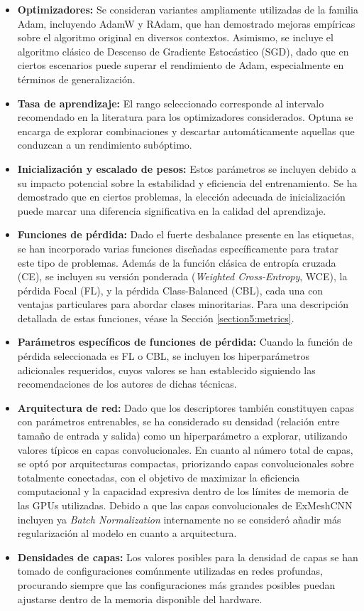\begin{itemize}
    \item \textbf{Optimizadores:} Se consideran variantes ampliamente utilizadas de la familia Adam, incluyendo AdamW y RAdam, que han demostrado mejoras empíricas sobre el algoritmo original en diversos contextos. Asimismo, se incluye el algoritmo clásico de Descenso de Gradiente Estocástico (SGD), dado que en ciertos escenarios puede superar el rendimiento de Adam, especialmente en términos de generalización.
    \item \textbf{Tasa de aprendizaje:} El rango seleccionado corresponde al intervalo recomendado en la literatura para los optimizadores considerados. Optuna se encarga de explorar combinaciones y descartar automáticamente aquellas que conduzcan a un rendimiento subóptimo. 
    \item \textbf{Inicialización y escalado de pesos:} Estos parámetros se incluyen debido a su impacto potencial sobre la estabilidad y eficiencia del entrenamiento. Se ha demostrado que en ciertos problemas, la elección adecuada de inicialización puede marcar una diferencia significativa en la calidad del aprendizaje.
    \item \textbf{Funciones de pérdida:} Dado el fuerte desbalance presente en las etiquetas, se han incorporado varias funciones diseñadas específicamente para tratar este tipo de problemas. Además de la función clásica de entropía cruzada (CE), se incluyen su versión ponderada (\textit{Weighted Cross-Entropy}, WCE), la pérdida Focal (FL), y la pérdida Class-Balanced (CBL), cada una con ventajas particulares para abordar clases minoritarias. Para una descripción detallada de estas funciones, véase la Sección \ref{section5:metrics}.
    \item \textbf{Parámetros específicos de funciones de pérdida:} Cuando la función de pérdida seleccionada es FL o CBL, se incluyen los hiperparámetros adicionales requeridos, cuyos valores se han establecido siguiendo las recomendaciones de los autores de dichas técnicas.
    \item \textbf{Arquitectura de red:} Dado que los descriptores también constituyen capas con parámetros entrenables, se ha considerado su densidad (relación entre tamaño de entrada y salida) como un hiperparámetro a explorar, utilizando valores típicos en capas convolucionales. En cuanto al número total de capas, se optó por arquitecturas compactas, priorizando capas convolucionales sobre totalmente conectadas, con el objetivo de maximizar la eficiencia computacional y la capacidad expresiva dentro de los límites de memoria de las GPUs utilizadas. Debido a que las capas convolucionales de ExMeshCNN incluyen ya \textit{Batch Normalization} internamente no se consideró añadir más regularización al modelo en cuanto a arquitectura.
    \item \textbf{Densidades de capas:} Los valores posibles para la densidad de capas se han tomado de configuraciones comúnmente utilizadas en redes profundas, procurando siempre que las configuraciones más grandes posibles puedan ajustarse dentro de la memoria disponible del hardware.
\end{itemize}

